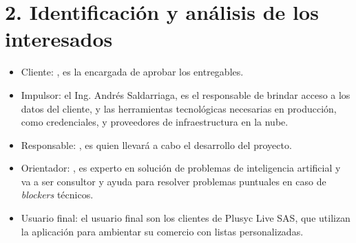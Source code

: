\documentclass[
11pt, %
]{charter}
\begin{document}

\section{2. Identificación y análisis de los interesados}
\label{sec:interesados}

 






 

\begin{itemize}
	\item Cliente: \clientename, es la encargada de aprobar los entregables.
  \item Impulsor: el Ing. Andrés Saldarriaga, es el responsable de brindar acceso a los datos del cliente, y las herramientas tecnológicas necesarias en producción, como credenciales, y proveedores de infraestructura en la nube.
  \item Responsable: \authorname, es quien llevará a cabo el desarrollo del proyecto.
	\item Orientador: \supname, es experto en solución de problemas de inteligencia artificial y va a ser consultor y ayuda para resolver problemas puntuales en caso de \textit{blockers} técnicos.
  \item Usuario final: el usuario final son los clientes de Plusyc Live SAS, que utilizan la aplicación para ambientar su comercio con listas personalizadas.
\end{itemize}
\end{document}
